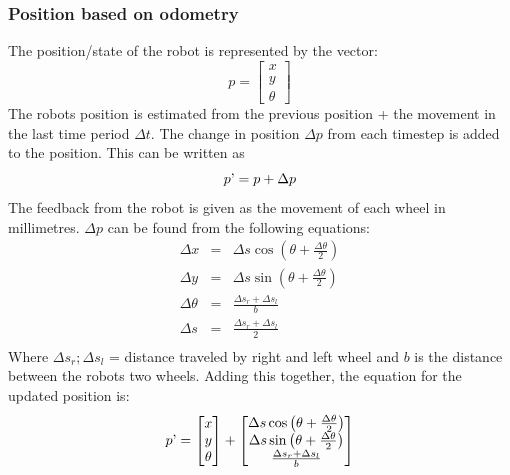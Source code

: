 \subsubsection{Position based on odometry}
The position/state of the robot is represented by the vector: 
\begin{equation}
  p = 
  \begin{bmatrix}
    x \\
    y \\
    \theta 
  \end{bmatrix}
\end{equation}
The robots position is estimated from the previous position + the movement in the last time period $\Delta t$. The change in position $\Delta p$ from each timestep is added to the position. This can be written as 
\begin{equation}
  p\textrm' = p + \Delta p
\end{equation}
The feedback from the robot is given as the movement of each wheel in millimetres. $\Delta p$ can be found from the following equations: 
\begin{eqnarray}
	\Delta x &=& \Delta s \cos \left(\theta + \frac{\Delta \theta}{2}\right) \\
	\Delta y &=& \Delta s \sin \left(\theta + \frac{\Delta \theta}{2}\right) \\
	\Delta \theta &=& \frac{\Delta s_r + \Delta s_l}{b} \\
	\Delta s &=& \frac{\Delta s_r + \Delta s_l}{2} \\
\end{eqnarray}
Where $\Delta s_r; \Delta s_l$ = distance traveled by right and left wheel and $b$ is the distance between the robots two wheels. Adding this together, the equation for the updated position is: 
\begin{equation}
  p\textrm' = 
  \begin{bmatrix}
    x \\
    y \\
    \theta 
  \end{bmatrix}
  +
  \begin{bmatrix}
    \Delta s \cos \left(\theta + \frac{\Delta \theta}{2}\right) \\
    \Delta s \sin \left(\theta + \frac{\Delta \theta}{2}\right) \\
    \frac{\Delta s_r + \Delta s_l}{b}
  \end{bmatrix}
\end{equation}
